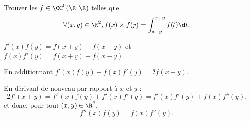 \begin{enonce}
\begin{exercise}[ID={RMS119 E732 MinesPont PC 2008},subtitle={},tags={}]
Trouver les $f\in\CC^0(\R,\R)$ telles que
\begin{equation*}
\forall (x,y)\in\R^2, f(x)\times f(y)=\int_{x-y}^{x+y} f(t)\d t.
\end{equation*}
\end{exercise}
\begin{solution}
$f'(x)f(y)=f(x+y)-f(x-y)$ et $f(x)f'(y)=f(x+y)+f(x-y)$.

En additionnant $f'(x)f(y)+f(x)f'(y)=2f(x+y)$.

En dérivant de nouveau par rapport à $x$ et $y$ :
\begin{equation*}
  2f'(x+y)=f''(x)f(y)+f'(x)f'(y)=f'(x)f'(y)+f(x)f''(y).
\end{equation*}
et donc, pour tout $(x,y)\in\R^2$,
\begin{equation*}
  f''(x)f(y)=f(x)f''(y).
\end{equation*}
\end{solution}
\end{enonce}
